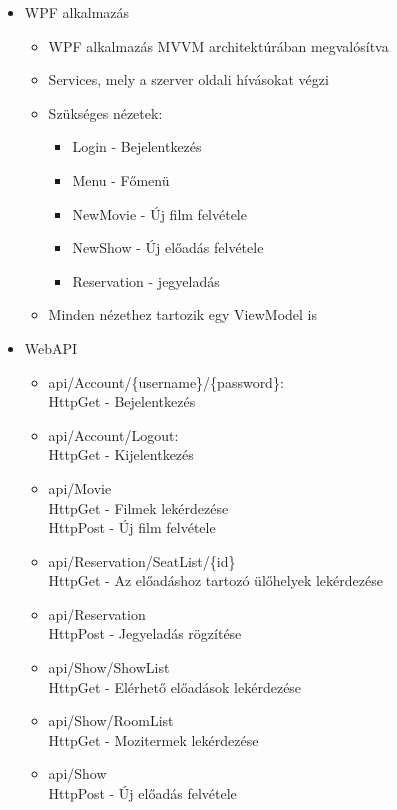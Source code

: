 \documentclass[11pt,a4paper]{article}
\begin{document}
\begin{itemize}
\item WPF alkalmazás
\begin{itemize}
	\item WPF alkalmazás MVVM architektúrában megvalósítva
	\item Services, mely a szerver oldali hívásokat végzi
	\item Szükséges nézetek:
	\begin{itemize}
		\item Login - Bejelentkezés
		\item Menu - Főmenü
		\item NewMovie - Új film felvétele
		\item NewShow - Új előadás felvétele
		\item Reservation - jegyeladás
	\end{itemize}
	\item Minden nézethez tartozik egy ViewModel is
\end{itemize}

\item WebAPI
\begin{itemize}
\item api/Account/\{username\}/\{password\}:\\[0.1cm]
HttpGet - Bejelentkezés
\item api/Account/Logout:\\[0.1cm]
HttpGet - Kijelentkezés
\item api/Movie\\[0.1cm]
HttpGet - Filmek lekérdezése\\[0.1cm]
HttpPost - Új film felvétele
\item api/Reservation/SeatList/\{id\}\\[0.1cm]
HttpGet - Az előadáshoz tartozó ülőhelyek lekérdezése
\item api/Reservation\\[0.1cm]
HttpPost - Jegyeladás rögzítése
\item api/Show/ShowList\\[0.1cm]
HttpGet - Elérhető előadások lekérdezése
\item api/Show/RoomList\\[0.1cm]
HttpGet - Mozitermek lekérdezése
\item api/Show\\[0.1cm]
HttpPost - Új előadás felvétele
\end{itemize}
\end{itemize}
\end{document}
